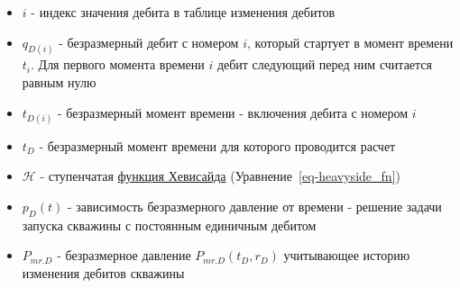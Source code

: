 \documentclass[
  russian,
  letterpaper,
  DIV=11,
  numbers=noendperiod,
  oneside]{scrartcl}
\providecommand{\tightlist}{%
  \setlength{\itemsep}{0pt}\setlength{\parskip}{0pt}}
\begin{document}
\begin{itemize}
\tightlist
\item
  \(i\) - индекс значения дебита в таблице изменения дебитов
\item
  \(q_{D(i)}\) - безразмерный дебит с номером \(i\), который стартует в
  момент времени \(t_i\). Для первого момента времени \(i\) дебит
  следующий перед ним считается равным нулю
\item
  \(t_{D(i)}\) - безразмерный момент времени - включения дебита с
  номером \(i\)
\item
  \(t_{D}\) - безразмерный момент времени для которого проводится расчет
\item
  \(\mathcal{H}\) - ступенчатая
  \href{https://ru.wikipedia.org/wiki/\%D0\%A4\%D1\%83\%D0\%BD\%D0\%BA\%D1\%86\%D0\%B8\%D1\%8F_\%D0\%A5\%D0\%B5\%D0\%B2\%D0\%B8\%D1\%81\%D0\%B0\%D0\%B9\%D0\%B4\%D0\%B0\#:~:text=\%D0\%A4\%D1\%83\%D0\%BD\%D0\%BA\%D1\%86\%D0\%B8\%D1\%8F\%20\%D0\%A5\%D0\%B5\%D0\%B2\%D0\%B8\%D1\%81\%D0\%B0\%D0\%B9\%D0\%B4\%D0\%B0\%20\%D1\%88\%D0\%B8\%D1\%80\%D0\%BE\%D0\%BA\%D0\%BE\%20\%D0\%B8\%D1\%81\%D0\%BF\%D0\%BE\%D0\%BB\%D1\%8C\%D0\%B7\%D1\%83\%D0\%B5\%D1\%82\%D1\%81\%D1\%8F\%20\%D0\%B2,\%D0\%B4\%D0\%BB\%D1\%8F\%20\%D0\%B7\%D0\%B0\%D0\%BF\%D0\%B8\%D1\%81\%D0\%B8\%20\%D1\%8D\%D0\%BC\%D0\%BF\%D0\%B8\%D1\%80\%D0\%B8\%D1\%87\%D0\%B5\%D1\%81\%D0\%BA\%D0\%BE\%D0\%B9\%20\%D1\%84\%D1\%83\%D0\%BD\%D0\%BA\%D1\%86\%D0\%B8\%D0\%B8\%20\%D1\%80\%D0\%B0\%D1\%81\%D0\%BF\%D1\%80\%D0\%B5\%D0\%B4\%D0\%B5\%D0\%BB\%D0\%B5\%D0\%BD\%D0\%B8\%D1\%8F.}{функция
  Хевисайда} (Уравнение~\ref{eq-heavyside_fn})
\item
  \(p_D\left(t\right)\) - зависимость безразмерного давление от времени
  - решение задачи запуска скважины с постоянным единичным дебитом
\item
  \(P_{mr.D}\) - безразмерное давление \(P_{mr.D}(t_D, r_D)\)
  учитывающее историю изменения дебитов скважины
\end{itemize}
\end{document}

